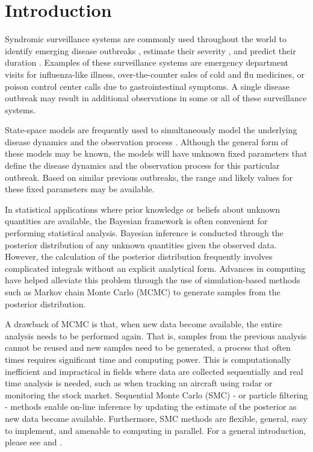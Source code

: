 \documentclass{elsarticle}
\begin{document}
\section{Introduction} \label{sec:intro}
Syndromic surveillance systems \citep{henning2004overview, hakenewerth2009north, Gins:Mohe:Pate:Bram:Smol:Bril:dete:2009} are commonly used throughout the world to identify emerging disease outbreaks \citep{neill2006bayesian}, estimate their severity \citep{merl2009statistical}, and predict their duration \cite{ludkovski2010optimal}. Examples of these surveillance systems are emergency department visits for influenza-like illness, over-the-counter sales of cold and flu medicines, or poison control center calls due to gastrointestinal symptoms. A single disease outbreak may result in additional observations in some or all of these surveillance systems. 

State-space models are frequently used to simultaneously model the underlying disease dynamics and the observation process \citep{Mart:Cone:Lope:Lope:baye:2008,merl2009statistical,ludkovski2010optimal,skvortsov2012monitoring,unkel2012statistical}. Although the general form of these models may be known, the models will have unknown fixed parameters that define the disease dynamics and the observation process for this particular outbreak. Based on similar previous outbreaks, the range and likely values for these fixed parameters may be available. 

In statistical applications where prior knowledge or beliefs about unknown quantities are available, the Bayesian framework is often convenient for performing statistical analysis.  Bayesian inference is conducted through the posterior distribution of any unknown quantities given the observed data. However, the calculation of the posterior distribution frequently involves complicated integrals without an explicit analytical form. Advances in computing have helped alleviate this problem through the use of simulation-based methods such as Markov chain Monte Carlo (MCMC) \citep{Gelf:Smit:samp:1990} to generate samples from the posterior distribution.

A drawback of MCMC is that, when new data become available, the entire analysis needs to be performed again. That is, samples from the previous analysis cannot be reused and new samples need to be generated, a process that often times requires significant time and computing power. This is computationally inefficient and impractical in fields where data are collected sequentially and real time analysis is needed, such as when tracking an aircraft using radar or monitoring the stock market. Sequential Monte Carlo (SMC) - or particle filtering - methods enable on-line inference by updating the estimate of the posterior as new data become available. Furthermore, SMC methods are flexible, general, easy to implement, and amenable to computing in parallel. For a general introduction, please see \cite{Douc:deFr:Gord:sequ:2001} and \cite{cappe2007overview}.
\end{document}

